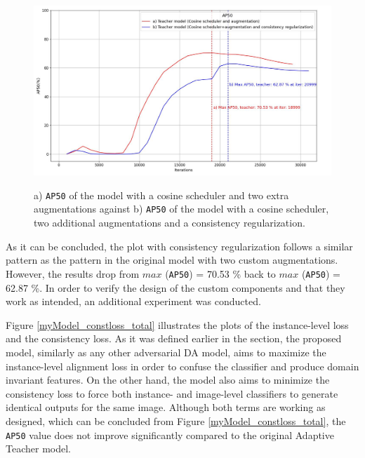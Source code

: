 \begin{figure}[htb]
	\begin{center}
		\includegraphics[width=14cm]{./AP50_Augm_consistency.jpg}
	\end{center}
	\caption{a) \texttt{AP50} of the model with a cosine  scheduler and two extra augmentations against b) \texttt{AP50} of the model with a cosine scheduler, two additional augmentations and a consistency regularization.}
	\begin{center}
		\label{myModel_experiment}
	\end{center}
\end{figure}

As it can be concluded, the plot with consistency regularization follows a similar pattern as the pattern in the original model with two custom augmentations. However, the results drop from $max$ (\texttt{AP50}) = 70.53 \% back to  $max$ (\texttt{AP50}) = 62.87 \%. In order to verify the design of the custom components and that they work as intended, an additional experiment was conducted. 

Figure \ref{myModel_constloss_total} illustrates the plots of the instance-level loss and the  consistency loss. As it was defined earlier in the  section, the proposed model, similarly as any other adversarial DA model, aims to maximize the instance-level alignment loss in order to confuse the classifier and produce domain invariant features. On the other hand, the model also aims to minimize the consistency loss to force both instance- and image-level classifiers to generate identical outputs for the same image. Although both terms are working as designed, which can be concluded from Figure \ref{myModel_constloss_total}, the \texttt{AP50} value does not improve significantly compared to the original Adaptive Teacher model. 

